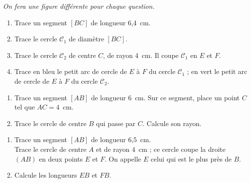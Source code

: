 {\em On fera une figure différente pour chaque question.}
\begin{myenumerate}
\item
\begin{enumerate}
\item Trace un segment $[BC]$ de longueur 6,4~cm.
\item Trace le cercle $\mathscr{C}_1$ de diamètre $[BC]$.
\item Trace le cercle $\mathscr{C}_2$ de centre $C$, de rayon
  4~cm. Il coupe $\mathscr{C}_1$ en $E$ et $F$.
\item Trace en bleu le petit arc de cercle de $E$ à $F$ du cercle
  $\mathscr{C}_1$ ; en vert le petit arc de cercle de $E$ à $F$ du cercle
  $\mathscr{C}_2$.
\end{enumerate}
\item
\begin{enumerate}
\item Trace un segment $[AB]$ de longueur 6~cm. Sur ce segment,
  place un point $C$ tel que $AC=4$~cm.
\item Trace le cercle de centre $B$ qui passe par $C$. Calcule son
  rayon.
\end{enumerate}
\item
\begin{enumerate}
\item Trace un segment $[AB]$ de longueur 6,5~cm.
\\Trace le cercle de centre $A$ et de rayon 4~cm ; ce cercle coupe
la droite $(AB)$ en deux points $E$ et $F$. On appelle $E$ celui qui
est le plus près de $B$.
\item Calcule les longueurs $EB$ et $FB$.
\end{enumerate}
\end{myenumerate}